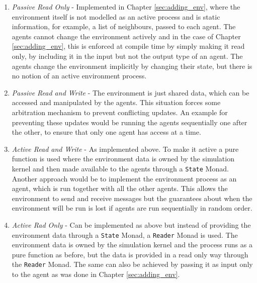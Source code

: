 \begin{enumerate}
	\item \textit{Passive Read Only} - Implemented in Chapter \ref{sec:adding_env}, where the environment itself is not modelled as an active process and is static information, for example, a list of neighbours, passed to each agent. The agents cannot change the environment actively and in the case of Chapter \ref{sec:adding_env}, this is enforced at compile time by simply making it read only, by including it in the input but not the output type of an agent. The agents change the environment implicitly by changing their state, but there is no notion of an active environment process.
	
	\item \textit{Passive Read and Write} - The environment is just shared data, which can be accessed and manipulated by the agents. This situation forces some arbitration mechanism to prevent conflicting updates. An example for preventing these updates would be running the agents sequentially one after the other, to ensure that only one agent has access at a time.
	
	\item \textit{Active Read and Write} - As implemented above. To make it active a pure function is used where the environment data is owned by the simulation kernel and then made available to the agents through a \texttt{State} Monad. Another approach would be to implement the environment process as an agent, which is run together with all the other agents. This allows the environment to send and receive messages but the guarantees about when the environment will be run is lost if agents are run sequentially in random order.
	
	\item \textit{Active Rad Only} - Can be implemented as above but instead of providing the environment data through a \texttt{State} Monad, a \texttt{Reader} Monad is used. The environment data is owned by the simulation kernel and the process runs as a pure function as before, but the data is provided in a read only way through the \texttt{Reader} Monad. The same can also be achieved by passing it as input only to the agent as was done in Chapter \ref{sec:adding_env}.
\end{enumerate}